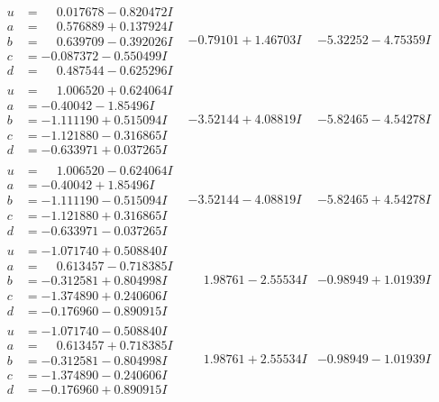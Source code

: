 \documentclass[1p]{elsarticle_modified}
\theoremstyle{definition}
\begin{document}
$$\begin{array}{c|c|c}
\begin{aligned}
u &= \phantom{-}0.017678 - 0.820472 I \\
a &= \phantom{-}0.576889 + 0.137924 I \\
b &= \phantom{-}0.639709 - 0.392026 I \\
c &= -0.087372 - 0.550499 I \\
d &= \phantom{-}0.487544 - 0.625296 I\end{aligned}
 & -0.79101 + 1.46703 I & -5.32252 - 4.75359 I \\ \hline\begin{aligned}
u &= \phantom{-}1.006520 + 0.624064 I \\
a &= -0.40042 - 1.85496 I \\
b &= -1.111190 + 0.515094 I \\
c &= -1.121880 - 0.316865 I \\
d &= -0.633971 + 0.037265 I\end{aligned}
 & -3.52144 + 4.08819 I & -5.82465 - 4.54278 I \\ \hline\begin{aligned}
u &= \phantom{-}1.006520 - 0.624064 I \\
a &= -0.40042 + 1.85496 I \\
b &= -1.111190 - 0.515094 I \\
c &= -1.121880 + 0.316865 I \\
d &= -0.633971 - 0.037265 I\end{aligned}
 & -3.52144 - 4.08819 I & -5.82465 + 4.54278 I \\ \hline\begin{aligned}
u &= -1.071740 + 0.508840 I \\
a &= \phantom{-}0.613457 - 0.718385 I \\
b &= -0.312581 + 0.804998 I \\
c &= -1.374890 + 0.240606 I \\
d &= -0.176960 - 0.890915 I\end{aligned}
 & \phantom{-}1.98761 - 2.55534 I & -0.98949 + 1.01939 I \\ \hline\begin{aligned}
u &= -1.071740 - 0.508840 I \\
a &= \phantom{-}0.613457 + 0.718385 I \\
b &= -0.312581 - 0.804998 I \\
c &= -1.374890 - 0.240606 I \\
d &= -0.176960 + 0.890915 I\end{aligned}
 & \phantom{-}1.98761 + 2.55534 I & -0.98949 - 1.01939 I\\

\end{array}$$
\end{document}
